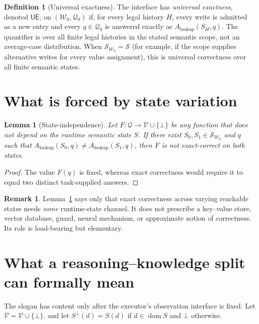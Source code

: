\documentclass[11pt]{article}
\theoremstyle{definition}
\newtheorem{definition}{Definition}
\newtheorem{remark}{Remark}
\theoremstyle{plain}
\newtheorem{lemma}{Lemma}
\newcommand{\Wr}{\mathcal{W}}
\newcommand{\Qu}{\mathcal{Q}}
\newcommand{\Va}{\mathcal{V}}
\newcommand{\bt}{\bot}
\newcommand{\UE}{\mathsf{UE}}
\newcommand{\Alkup}{A_{\mathrm{lookup}}}
\begin{document}
\begin{definition}[Universal exactness]\label{def:ue}
The interface has \emph{universal exactness}, denoted \(\UE\), on
\((\Wr_0,\Qu_0)\) if, for every legal history \(H\), every write is admitted
as a new entry and every \(q\in\Qu_0\) is answered exactly as
\(\Alkup(S_H,q)\).
The quantifier is over all finite legal histories in the stated semantic
scope, not an average-case distribution.  When
\(\mathcal S_{\Wr_0}=\mathcal S\) (for example, if the scope supplies
alternative writes for every value assignment), this is universal correctness
over all finite semantic states.
\end{definition}

\section{What is forced by state variation}

\begin{lemma}[State-independence]\label{lem:state}
Let \(F:\Qu\to\Va\cup\{\bt\}\) be any function that does not depend on the
runtime semantic state \(S\).  If there exist
\(S_0,S_1\in\mathcal S_{\Wr_0}\) and \(q\) such that
\(\Alkup(S_0,q)\neq\Alkup(S_1,q)\), then \(F\) is not exact-correct on
both states.
\end{lemma}

\begin{proof}
The value \(F(q)\) is fixed, whereas exact correctness would require it to
equal two distinct task-supplied answers.
\end{proof}

\begin{remark}
Lemma~\ref{lem:state} says only that exact correctness across varying
reachable states needs \emph{some} runtime-state channel.  It does not prescribe a
key--value store, vector database, guard, neural mechanism, or approximate
notion of correctness.  Its role is load-bearing but elementary.
\end{remark}

\section{What a reasoning--knowledge split can formally mean}

The slogan has content only after the executor's observation interface is
fixed.  Let \(\overline{\Va}=\Va\cup\{\bt\}\), and let
\(S^{\bt}(d)=S(d)\) if \(d\in\operatorname{dom}S\) and \(\bt\) otherwise.
\end{document}
